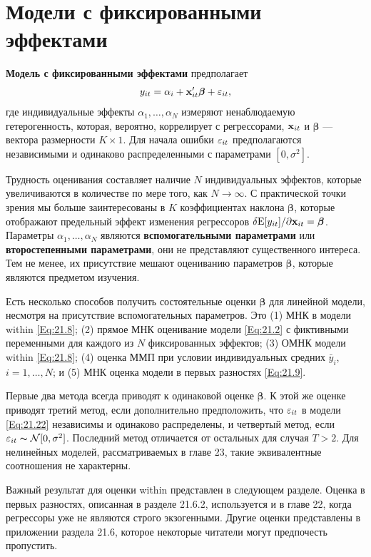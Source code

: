 \section{Модели с фиксированными эффектами}
 

\textbf{Модель с фиксированными эффектами} предполагает 
\begin{align}
y_{it}=\alpha_i +\mathbf{x}'_{it}\bm\beta +\varepsilon_{it},
\label{Eq:21.22}
\end{align}
где индивидуальные эффекты $\alpha_1, \dots , \alpha_N$ измеряют ненаблюдаемую гетерогенность, которая, вероятно, коррелирует с регрессорами, $\mathbf{x}_{it}$ и $\bm\beta$ --- вектора размерности $K \times 1$. Для начала ошибки $\varepsilon_{it}$ предполагаются независимыми и одинаково распределенными с параметрами $[0, \sigma^2]$.

Трудность оценивания составляет наличие $N$ индивидуальных эффектов, которые увеличиваются в количестве по мере того, как $N \rightarrow \infty$. С практической точки зрения мы больше заинтересованы в $K$ коэффициентах наклона $\bm\beta$, которые отображают  предельный эффект изменения регрессоров $\delta \mathrm E[y_{it}]/ \partial \mathbf{x}_{it}=\bm\beta$. Параметры $\alpha_1, \dots, \alpha_N$ являются \textbf{вспомогательными параметрами} или \textbf{второстепенными параметрами}, они не представляют существенного интереса. Тем не менее, их присутствие мешают оцениванию параметров $\bm\beta$, которые являются предметом изучения.

Есть несколько способов получить состоятельные оценки $\bm\beta$ для линейной модели, несмотря на присутствие вспомогательных параметров. Это (1) МНК в модели within \ref{Eq:21.8}; (2) прямое МНК оценивание модели \ref{Eq:21.2} с фиктивными переменными для каждого из $N$ фиксированных эффектов; (3) ОМНК модели within \ref{Eq:21.8}; (4) оценка ММП при условии индивидуальных средних $\bar{y}_i$, $i=1, \dots, N$; и (5) МНК оценка модели в первых разностях \ref{Eq:21.9}.

Первые два метода всегда приводят к одинаковой оценке $\bm\beta$. К этой же оценке приводят третий метод, если дополнительно предположить, что $\varepsilon_{it}$ в модели \ref{Eq:21.22} независимы и одинаково распределены, и четвертый метод, если $\varepsilon_{it} \thicksim \mathcal N[0, \sigma^2]$. Последний метод отличается от остальных для случая  $T>2$. Для нелинейных моделей, рассматриваемых в главе 23, такие эквивалентные соотношения не характерны. 

Важный результат для оценки within представлен в следующем разделе. Оценка в первых разностях, описанная в разделе 21.6.2, используется и в главе 22, когда регрессоры уже не являются строго экзогенными. Другие оценки представлены в приложении раздела 21.6, которое некоторые читатели могут предпочесть пропустить.

